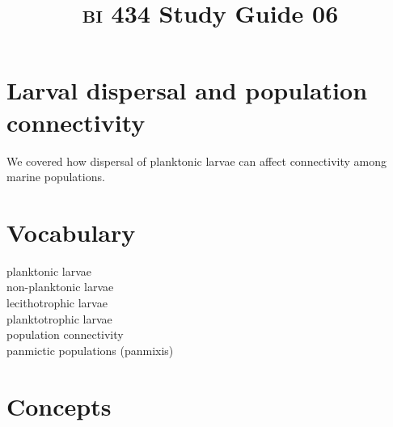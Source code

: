 \documentclass[letterpaper]{tufte-handout}
\title{{\scshape bi} 434 Study Guide 06}
\date{} %
\begin{document}
\maketitle	%

\section*{Larval dispersal and population connectivity}

We covered how dispersal of planktonic larvae can affect connectivity among marine populations.

\section*{Vocabulary}

\vspace{-1\baselineskip}
\begin{multicols}{2}
planktonic larvae \\
non-planktonic larvae\\
lecithotrophic larvae\\
planktotrophic larvae\\
population connectivity \\
panmictic populations (panmixis) \\
\end{multicols}

\section*{Concepts}
\end{document}
